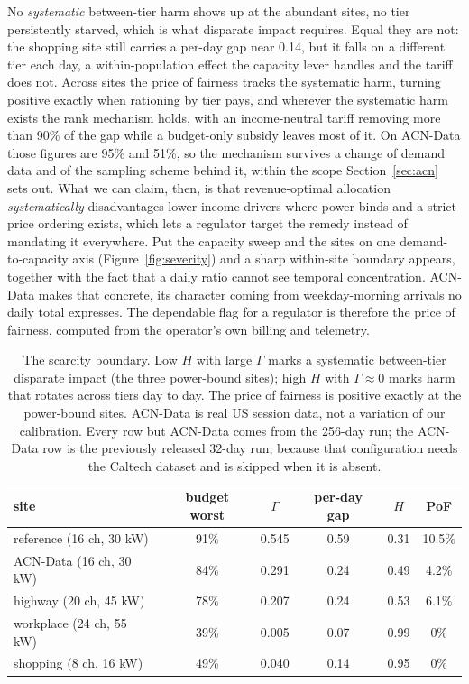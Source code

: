 \documentclass[manuscript, screen, review, anonymous]{acmart}
\begin{document}
No \emph{systematic} between-tier harm shows up at the abundant sites, no tier persistently starved, which is what disparate impact requires. Equal they are not: the shopping site still carries a per-day gap near 0.14, but it falls on a different tier each day, a within-population effect the capacity lever handles and the tariff does not. Across sites the price of fairness tracks the systematic harm, turning positive exactly when rationing by tier pays, and wherever the systematic harm exists the rank mechanism holds, with an income-neutral tariff removing more than 90\% of the gap while a budget-only subsidy leaves most of it. On ACN-Data those figures are 95\% and 51\%, so the mechanism survives a change of demand data and of the sampling scheme behind it, within the scope Section~\ref{sec:acn} sets out. What we can claim, then, is that revenue-optimal allocation \emph{systematically} disadvantages lower-income drivers where power binds and a strict price ordering exists, which lets a regulator target the remedy instead of mandating it everywhere. Put the capacity sweep and the sites on one demand-to-capacity axis (Figure~\ref{fig:severity}) and a sharp within-site boundary appears, together with the fact that a daily ratio cannot see temporal concentration. ACN-Data makes that concrete, its character coming from weekday-morning arrivals no daily total expresses. The dependable flag for a regulator is therefore the price of fairness, computed from the operator's own billing and telemetry.

\begin{table}[t]
\centering
\small
\caption{The scarcity boundary. Low $H$ with large $\Gamma$ marks a systematic between-tier disparate impact (the three power-bound sites); high $H$ with $\Gamma\approx 0$ marks harm that rotates across tiers day to day. The price of fairness is positive exactly at the power-bound sites. ACN-Data is real US session data, not a variation of our calibration. Every row but ACN-Data comes from the 256-day run; the ACN-Data row is the previously released 32-day run, because that configuration needs the Caltech dataset and is skipped when it is absent.}
\label{tab:sites}
\begin{tabular}{lccccc}
\toprule
site & budget worst & $\Gamma$ & per-day gap & $H$ & PoF \\
\midrule
reference (16 ch, 30 kW) & 91\% & 0.545 & 0.59 & 0.31 & 10.5\% \\
ACN-Data (16 ch, 30 kW)  & 84\% & 0.291 & 0.24 & 0.49 & 4.2\% \\
highway (20 ch, 45 kW)   & 78\% & 0.207 & 0.24 & 0.53 & 6.1\% \\
workplace (24 ch, 55 kW) & 39\% & 0.005 & 0.07 & 0.99 & 0\% \\
shopping (8 ch, 16 kW)   & 49\% & 0.040 & 0.14 & 0.95 & 0\% \\
\bottomrule
\end{tabular}
\end{table}
\end{document}
